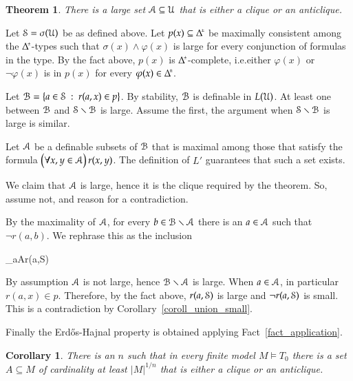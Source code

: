 \documentclass[10pt,oneside, openany]{book}
\def\A{\forall}
\def\models{\vDash}
\def\pmDelta{\Delta\hskip-.3ex\raisebox{1ex}{\tiny$\pm$}}
\def\sm{\smallsetminus}
\def\Aa{\EuScript A}
\def\U{\EuScript U}
\def\B{\EuScript B}
\def\S{\EuScript S}
\def\phi{\varphi}
\newcounter{thm}[chapter]
\theoremstyle{mio}
\newtheorem{theorem}[thm]{Theorem}
\newtheorem{corollary}[thm]{Corollary}
\theoremstyle{liscio}
\def\QED{\noindent\nolinebreak[4]\hfill\rlap{\ \ $\Box$}\medskip}
\renewenvironment{proof}[1][Proof]%
{\smallskip\begin{trivlist}\item[\hskip\labelsep {\bf #1}]}
{\QED\end{trivlist}}
\begin{document}
\begin{theorem}
  There is a large set $\Aa\subseteq\U$ that is either a clique or an anticlique.
\end{theorem}

\begin{proof}
  Let $\S=\sigma(\U)$ be as defined above.
  Let $p(x)\subseteq\pmDelta$ be maximally consistent among the $\pmDelta$-types such that $\sigma(x)\wedge\phi(x)$ is large for every conjunction of formulas in the type.
  By the fact above, $p(x)$ is $\pmDelta$-complete, i.e.\@ either $\phi(x)$ or $\neg\phi(x)$ is in $p(x)$ for every $\phi(x)\in\pmDelta$.


  Let $\B=\{a\in\S\ :\ r(a,x)\in p\}$.
  By stability, $\B$ is definable in $L(\U)$.
  At least one between $\B$ and $\S\sm\B$ is large.
  Assume the first, the argument when $\S\sm\B$ is large is similar.

  Let $\Aa$ be a definable subsets of $\B$ that is maximal among those that satisfy the formula $\big(\A x,y\in\Aa\big)\,r(x,y)$.
  The definition of $L'$ guarantees that such a set exists.
  
  We claim that $\Aa$ is large, hence it is the clique required by the theorem.
  So, assume not, and reason for a contradiction.

  By the maximality of $\Aa$, for every $b\in\B\sm\Aa$ there is an $a\in\Aa$ such that $\neg r(a,b)$.
  We rephrase this as the inclusion

  \ceq{\hfill\B\sm\Aa}
  {\subseteq}
  {\bigcup_{a\in\Aa}\neg r(a,\S)}

  By assumption $\Aa$ is not large, hence $\B\sm\Aa$ is large.
  When $a\in\Aa$, in particular $r(a,x)\in p$.
  Therefore, by the fact above, $r(a,\S)$ is large and $\neg r(a,\S)$ is small.
  This is a contradiction by Corollary~\ref{coroll_union_small}.
\end{proof}

Finally the Erd\H{o}s-Hajnal property is obtained applying Fact~\ref{fact_application}.

\begin{corollary}
  There is an $n$ such that in every finite model $M\models T_0$ there is a set $A\subseteq M$ of cardinality at least $|M|^{1/n}$ that is either a clique or an anticlique.\QED
\end{corollary}
\end{document}
